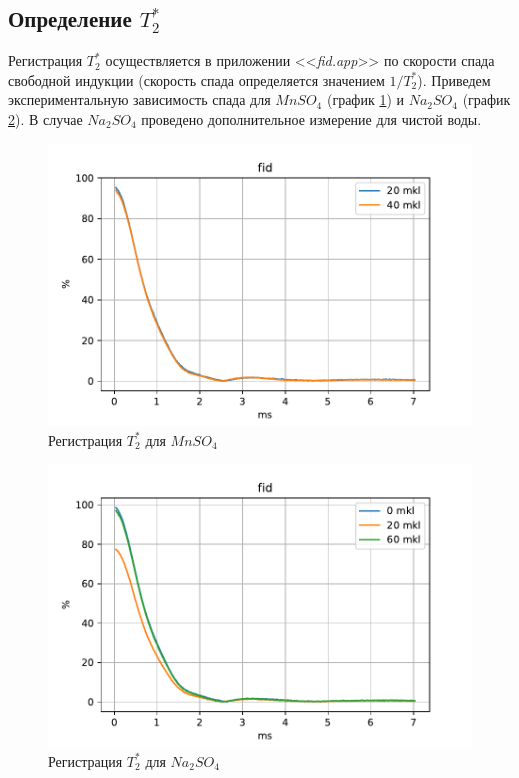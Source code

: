 \subsection{Определение $ T_2^* $}
Регистрация $ T_2^* $ осуществляется в приложении <<\textit{fid.app}>> по скорости спада свободной индукции (скорость спада определяется значением $ 1/T_2^* $). Приведем экспериментальную зависимость спада для $ Mn SO_4 $ (график \ref{fig:mnfid}) и $ Na_2 SO_4 $ (график \ref{fig:nafid}). В случае $ Na_2 SO_4 $ проведено дополнительное измерение для чистой воды.

\begin{figure}[h]
	\hspace{-1em}
	\includegraphics[width=1.0\linewidth]{data/Mn_fid}
	\caption{Регистрация $ T_2^* $ для $ Mn SO_4 $}
	\label{fig:mnfid}
\end{figure}

\begin{figure}[h]
	\hspace{-1em}
	\includegraphics[width=1.0\linewidth]{data/Na_fid}
	\caption{Регистрация $ T_2^* $ для $ Na_2 SO_4 $}
	\label{fig:nafid}
\end{figure}


